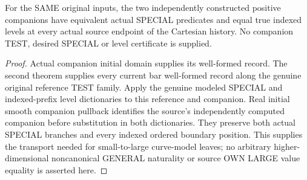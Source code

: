 \begin{theorem}
\label{hir:original-arbitrary-bound-companion-special-level-smooth}
\leanok
For the SAME original inputs, the two independently constructed
positive companions have equivalent actual SPECIAL predicates and
equal true indexed levels at every actual source endpoint of the
Cartesian history. No companion TEST, desired SPECIAL or level
certificate is supplied.
\end{theorem}
\begin{proof}
Actual companion initial domain supplies its well-formed record.
The second theorem supplies every current bar well-formed record
along the genuine original reference TEST family. Apply the genuine
modeled SPECIAL and indexed-prefix level dictionaries to this
reference and companion. Real initial smooth companion pullback
identifies the source's independently computed companion before
substitution in both dictionaries. They preserve both actual SPECIAL
branches and every indexed ordered boundary position. This supplies
the transport needed for small-to-large curve-model leaves; no
arbitrary higher-dimensional noncanonical GENERAL naturality or
source OWN LARGE value equality is asserted here.
\end{proof}
